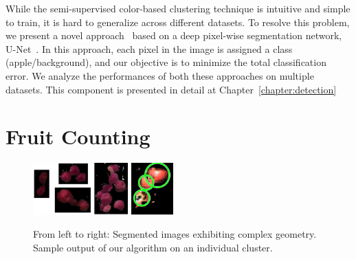 While the semi-supervised color-based clustering technique is intuitive and simple to train, it is hard to generalize across different datasets. To resolve this problem, we present a novel approach~\cite{hani_jfr_counting} based on a deep pixel-wise segmentation network, U-Net~\cite{ronneberger_u-net:_2015}. In this approach, each pixel in the image is assigned a class (apple/background), and our objective is to minimize the total classification error. We analyze the performances of both these approaches on multiple datasets. This component is presented in detail at Chapter~\ref{chapter:detection}




\section{Fruit Counting}\label{subsec:sysperframecounting}

\begin{figure}[!hbpt]
{\centering
\includegraphics[height=2cm]{figures/prelim/capple1.png}
\vrule 
\includegraphics[height=2cm]{figures/prelim/gmmcomp.png}


\caption{
From left to right: Segmented images exhibiting complex geometry. Sample output of our algorithm on an individual cluster. \label{fig:counting_ex}}
}
\end{figure}

